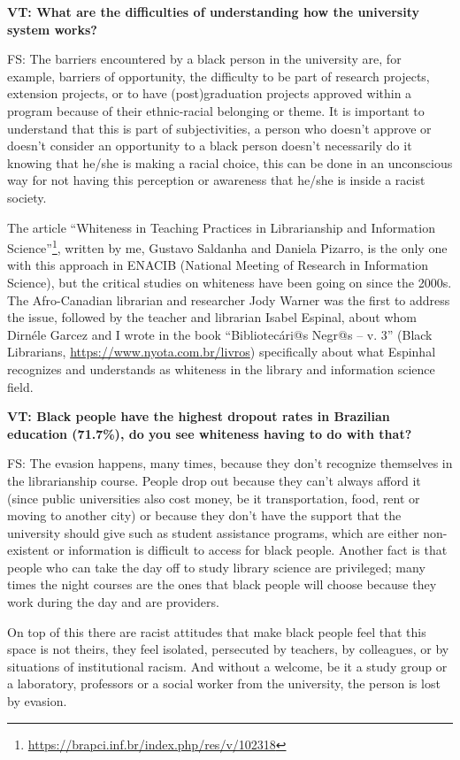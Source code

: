 \documentclass[a4paper,
fontsize=11pt,
oneside,
numbers=noperiodatend,
parskip=half-,
bibliography=totoc,
final
]{scrartcl}
\begin{document}
\textbf{VT: What are the difficulties of understanding how the
university system works?}

FS: The barriers encountered by a black person in the university are,
for example, barriers of opportunity, the difficulty to be part of
research projects, extension projects, or to have (post)gradu\-ation
projects approved within a program because of their ethnic-racial
belonging or theme. It is important to understand that this is part of
subjectivities, a person who doesn't approve or doesn't consider an
opportunity to a black person doesn't necessarily do it knowing that
he/she is making a racial choice, this can be done in an unconscious way
for not having this perception or awareness that he/she is inside a
racist society.

The article \enquote{Whiteness in Teaching Practices in Librarianship and
Information Science}\footnote{\url{https://brapci.inf.br/index.php/res/v/102318}},
written by me, Gustavo Saldanha and Daniela Pizarro, is the only one
with this approach in ENACIB (National Meeting of Research in
Information Science), but the critical studies on whiteness have been
going on since the 2000s. The Afro-Canadian librarian and researcher
Jody Warner was the first to address the issue, followed by the teacher
and librarian Isabel Espinal, about whom Dirnéle Garcez and I wrote in
the book \enquote{Bibliotecári@s Negr@s -- v. 3} (Black Librarians,
\url{https://www.nyota.com.br/livros}) specifically about what Espinhal
recognizes and understands as whiteness in the library and information
science field.

\textbf{VT: Black people have the highest dropout rates in Brazilian
education (71.7\%), do you see whiteness having to do with that?}

FS: The evasion happens, many times, because they don't recognize
themselves in the librarianship course. People drop out because they
can't always afford it (since public universities also cost money, be it
transportation, food, rent or moving to another city) or because they
don't have the support that the university should give such as student
assistance programs, which are either non-existent or information is
difficult to access for black people. Another fact is that people who
can take the day off to study library science are privileged; many times
the night courses are the ones that black people will choose because
they work during the day and are providers.

On top of this there are racist attitudes that make black people feel
that this space is not theirs, they feel isolated, persecuted by
teachers, by colleagues, or by situations of institutional racism. And
without a welcome, be it a study group or a laboratory, professors or a
social worker from the university, the person is lost by evasion.
\end{document}
